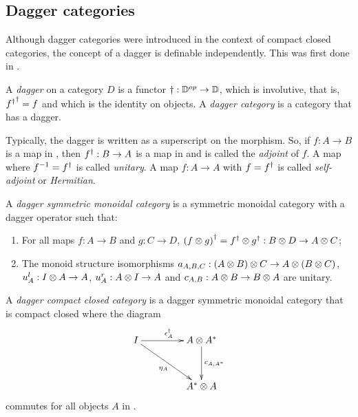 \subsection{Dagger categories}\label{ssec:daggercategories}

Although dagger categories were introduced in the context of compact closed categories, the concept
of a dagger is definable independently. This was first done in \cite{selinger05:dagger}.

\begin{definition}\label{def:daggercat}
  A \emph{dagger} on a category $D$ is a functor $\dagger:{\mathbb{D}}^{op}\to \mathbb{D}$, which is  involutive,
  that is, ${{f}^{\dagger}}^{\dagger} = f$ and which is the identity on objects. A \emph{dagger category} is a
  category that has a dagger.
\end{definition}

Typically, the dagger is written as a superscript on the morphism. So, if $f:A\to B$ is a map in
\cD, then ${f}^{\dagger}:B\to A$ is a map in \cD{} and is called the \emph{adjoint} of $f$. A map where
$f^{-1} = {f}^{\dagger}$ is called \emph{unitary}. A map $f:A\to A$ with $f={f}^{\dagger}$ is called
\emph{self-adjoint} or \emph{Hermitian}.

\begin{definition}\label{def:daggersmc}
  A \emph{dagger symmetric monoidal category} is a symmetric monoidal category \cD{} with a dagger
  operator such that:
  \begin{enumerate}[{(}i{)}]
    \item For all maps $f:A\to B$ and $g:C\to D$, ${(f\otimes g)}^{\dagger} = {f}^{\dagger}\otimes{g}^{\dagger}:B\otimes D \to A\otimes C$;\label{defitem:dagger_smc_one}
    \item The monoid structure isomorphisms $a_{A,B,C}:(A\otimes B)\otimes C\to A\otimes(B\otimes C)$, $u^l_{A}:I\otimes A\to
      A$, $u^r_{A}:A\otimes I \to A$ and  $c_{A,B}:A\otimes B \to B\otimes A$ are unitary.\label{defitem:dagger_smc_two}
  \end{enumerate}
\end{definition}


\begin{definition}\label{def:daggercompact}
  A \emph{dagger compact closed category} \cD{} is a dagger symmetric monoidal category
  that is compact closed where the diagram
  \[
    \xymatrix @C+20pt @R+10pt{
      I \ar[r]^{\epsilon^{\dagger}_{A}} \ar[dr]_{\eta_{A}} &A\*A^{*}\ar[d]^{c_{A,A^{*}}}\\
      &A^{*}\* A
    }
  \]
  commutes for all  objects $A$ in \cD.
\end{definition}

